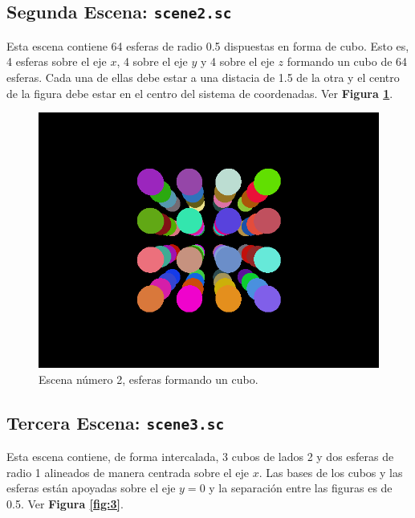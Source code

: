 \documentclass[a4paper,10pt]{article}
\begin{document}
\subsection{Segunda Escena: \texttt{scene2.sc}}
Esta escena contiene 64 esferas de radio 0.5 dispuestas en forma de cubo.  Esto es, 4 esferas sobre el eje $x$, 4 sobre el eje $y$ y 4 sobre el eje $z$ formando un cubo de 64 esferas. Cada una de ellas debe estar a una distacia de 1.5 de la otra y el centro de la figura debe estar en el centro del sistema de coordenadas. Ver \textbf{Figura \ref{fig:2}}.

\begin{figure}[h]
 \centering
 \includegraphics[width=320pt,keepaspectratio=true]{../scene2.png}
 \caption{Escena n\'umero 2, esferas formando un cubo.}
 \label{fig:2}
\end{figure}

\subsection{Tercera Escena: \texttt{scene3.sc}}
Esta escena contiene, de forma intercalada, 3 cubos de lados 2 y dos esferas de radio 1 alineados de manera centrada sobre el eje $x$.  Las bases de los cubos y las esferas est\'an apoyadas sobre el eje $y=0$ y la separaci\'on entre las figuras es de 0.5. Ver \textbf{Figura \ref{fig:3}}.
\end{document}
